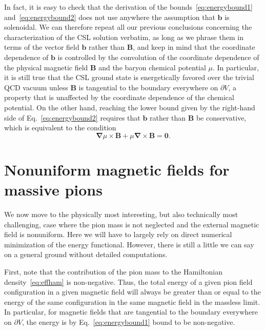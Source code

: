 \documentclass[pdflatex,iicol,sn-mathphys-num]{sn-jnl}
\let\m=\mu
\let\de=\partial
\newcommand{\vek}[1]{\bm{#1}}%
\newcommand{\grad}{\vek\nabla}%
\newcommand{\bmag}{b}%
\begin{document}
In fact, it is easy to check that the derivation of the bounds~\eqref{eq:energybound1} and~\eqref{eq:energybound2} does not use anywhere the assumption that $\vek\bmag$ is solenoidal. We can therefore repeat all our previous conclusions concerning the characterization of the CSL solution verbatim, as long as we phrase them in terms of the vector field $\vek\bmag$ rather than $\vek B$, and keep in mind that the coordinate dependence of $\vek\bmag$ is controlled by the convolution of the coordinate dependence of the physical magnetic field $\vek B$ and the baryon chemical potential $\m$. In particular, it is still true that the CSL ground state is energetically favored over the trivial QCD vacuum unless $\vek B$ is tangential to the boundary everywhere on $\de V$, a property that is unaffected by the coordinate dependence of the chemical potential. On the other hand, reaching the lower bound given by the right-hand side of Eq.~\eqref{eq:energybound2} requires that $\vek\bmag$ rather than $\vek B$ be conservative, which is equivalent to the condition
\begin{equation}
\grad\m\times\vek B+\m\grad\times\vek B=\vek0.
\end{equation}


\section{Nonuniform magnetic fields for massive pions}
\label{sec:nonuniformBnonzeroM}

We now move to the physically most interesting, but also technically most challenging, case where the pion mass is not neglected and the external magnetic field is nonuniform. Here we will have to largely rely on direct numerical minimization of the energy functional. However, there is still a little we can say on a general ground without detailed computations.

First, note that the contribution of the pion mass to the Hamiltonian density~\eqref{eq:effham} is non-negative. Thus, the total energy of a given pion field configuration in a given magnetic field will always be greater than or equal to the energy of the same configuration in the same magnetic field in the massless limit. In particular, for magnetic fields that are tangential to the boundary everywhere on $\de V$, the energy is by Eq.~\eqref{eq:energybound1} bound to be non-negative.
\end{document}
